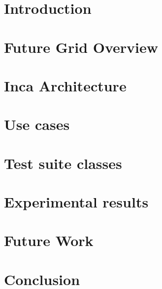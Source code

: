 \documentclass{sig-alternate}
\begin{document}
\title{}



\author{
\alignauthor
Shava Smallen, Sameer Tilak, etc. \\
 \\ 
\\ 
\\
}

\maketitle

\begin{abstract}

\end{abstract}

\section{Introduction}

\section{Future Grid Overview}

\section{Inca Architecture}

\section{Use cases}

\section{Test suite classes}

\section{Experimental results}

\section{Future Work}

\section{Conclusion}





 
\end{document}
